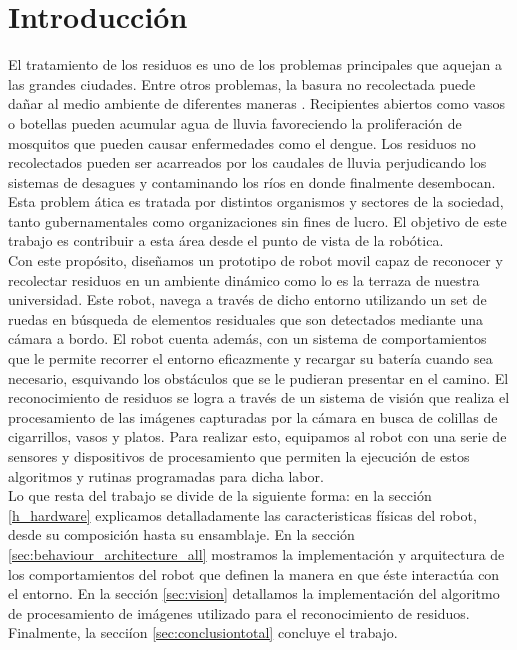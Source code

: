
\section{\label{intro} Introducci\'on}
El tratamiento de los residuos es uno de los problemas principales que 
aquejan a las grandes ciudades. Entre otros problemas, la basura no 
recolectada puede da\~nar al medio ambiente de diferentes maneras . Recipientes abiertos como 
vasos o botellas pueden acumular agua de lluvia favoreciendo la 
proliferaci\'on de mosquitos que pueden causar enfermedades como el dengue. Los residuos no recolectados pueden ser acarreados por los caudales de lluvia perjudicando
los sistemas de desagues y contaminando los r\'ios en donde finalmente 
desembocan. Esta problem
\'atica es tratada por distintos organismos y sectores de la sociedad, 
tanto gubernamentales como organizaciones sin fines de lucro. El objetivo de este trabajo es 
contribuir a esta \'area desde el punto de vista de la rob\'otica.\\  
\indent Con este prop\'osito, dise\~namos un prototipo de robot movil capaz de reconocer y recolectar
residuos en un ambiente din\'amico como lo es la terraza de nuestra universidad. Este robot, navega a través de dicho entorno
utilizando un set de ruedas en b\'usqueda de elementos residuales que 
son detectados mediante una c\'amara a bordo. El robot cuenta adem\'as,
con un sistema de comportamientos que le permite recorrer el entorno eficazmente y recargar su bater\'ia cuando sea necesario, esquivando 
los obst\'aculos que se le pudieran presentar en el camino. El reconocimiento de residuos se logra a trav\'es de un sistema de visi\'on que
realiza el procesamiento de las im\'agenes capturadas por la cámara en 
busca de colillas de cigarrillos, vasos y platos. Para realizar esto,  
equipamos  al robot con una serie de sensores y dispositivos de 
procesamiento que permiten la ejecución de  estos algoritmos y rutinas 
programadas para dicha labor. \\  
\indent Lo que resta del trabajo se divide de la siguiente 
forma:  en la secci\'on \ref{h_hardware} explicamos detalladamente 
las caracteristicas f\'isicas del robot, desde su composici\'on hasta su ensamblaje. 
En la secci\'on \ref{sec:behaviour_architecture_all} mostramos la 
implementaci\'on y arquitectura de los comportamientos del robot que 
definen la manera en que \'este interact\'ua con el entorno. En la 
secci\'on \ref{sec:vision} detallamos la implementaci\'on del 
algoritmo de procesamiento de im\'agenes utilizado para el reconocimiento de residuos. 
Finalmente, la secci\'ion \ref{sec:conclusiontotal} concluye el 
trabajo.
	
